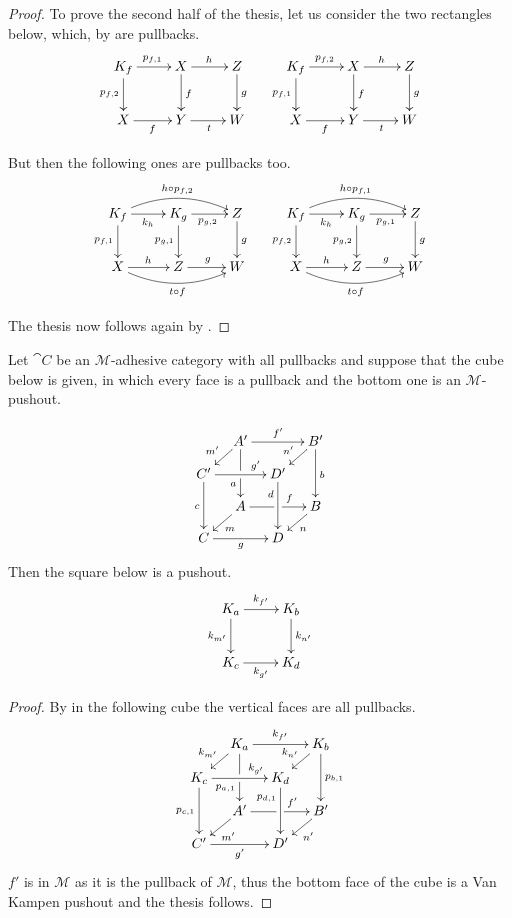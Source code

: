 {\begin{proof}
	To prove the second half of the thesis, let us consider the  two rectangles below, which, by  are pullbacks.
\[\xymatrix{K_f\ar[r]^{p_{f,1}}  \ar[d]_{p_{f,2}}& X \ar[r]^{h} \ar[d]^{f} & Z \ar[d]^{g} & K_f \ar[r]^{p_{f,2}}  \ar[d]_{p_{f,1}} & X \ar[d]^{f} \ar[r]^{h}& Z \ar[d]^{g}\\
	X \ar[r]_{f}& Y \ar[r]_{t}& W&  X \ar[r]_f & Y\ar[r]_{t} & W}\]
	
	But then the following ones are pullbacks too.
 	\[\xymatrix{K_f \ar@/^.4cm/[rr]^{h\circ p_{f,2}} \ar[r]_{k_h} \ar[d]_{p_{f,1}}& K_g  \ar[r]_{p_{g,2}} \ar[d]_{p_{g,1}} & Z \ar[d]^{g} & K_f \ar@/^.4cm/[rr]^{h\circ p_{f,1}} \ar[r]_{k_h} \ar[d]_{p_{f,2}}& K_g \ar[r]_{p_{g,1}} \ar[d]_{p_{g,2}} & Z \ar[d]^{g}\\X \ar@/_.4cm/[rr]_{t\circ f}\ar[r]^{h}& Z \ar[r]^{g} & W & X \ar@/_.4cm/[rr]_{t\circ f} \ar[r]^{h}& Z \ar[r]^{g}& W}\]
 	
 	The thesis now follows again by .
\end{proof}


\begin{lemma}\label{lem:salvavita2}
Let $\cat{C}$ be an $\mathcal{M}$-adhesive category with all pullbacks and suppose that the cube below is given, in which every face is a pullback and the bottom one is an $\mathcal{M}$-pushout.

 	\[\xymatrix@C=10pt@R=10pt{&A'\ar[dd]|\hole_(.65){a}\ar[rr]^{f'} \ar[dl]_{m'} && B' \ar[dd]^{b} \ar[dl]_{n'} \\ C'  \ar[dd]_{c}\ar[rr]^(.7){g'} & & D' \ar[dd]_(.3){d}\\&A\ar[rr]|\hole^(.65){f} \ar[dl]^{m} && B \ar[dl]^{n} \\C \ar[rr]_{g} & & D}\]
Then the square below is a pushout.
\[\xymatrix{K_{a} \ar[r]^{k_{f'}}  \ar[d]_{k_{m'}}& K_b \ar[d]^{k_{n'}}\\ K_c \ar[r]_{k_{g'}} & K_d}\]
\end{lemma}
\begin{proof} By  in the following cube the vertical faces are all pullbacks. 
		\[\xymatrix@C=10pt@R=10pt{&K_a\ar[dd]|\hole_(.65){p_{a,1}}\ar[rr]^{k_{f'}} \ar[dl]_{k_{m'}} && K_b \ar[dd]^{p_{b,1}} \ar[dl]_{k_{n'}} \\ K_c  \ar[dd]_{p_{c,1}}\ar[rr]^(.7){k_{g'}} & & K_d \ar[dd]_(.3){p_{d,1}}\\&A'\ar[rr]|\hole^(.65){f'} \ar[dl]^{m'} && B' \ar[dl]^{n'} \\C' \ar[rr]_{g'} & & D'}\]
	$f'$ is in $\mathcal{M}$ as it is the pullback of $\mathcal{M}$, thus the bottom face of the cube is a Van Kampen pushout and the thesis follows.
\end{proof}


}
